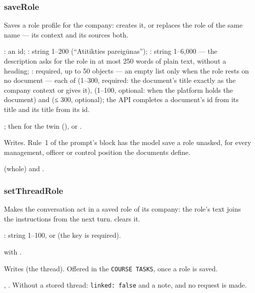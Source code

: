 \subsubsection{saveRole}\label{sec:tools:saveRole}
\begin{description}[style=multiline, leftmargin=19mm, labelwidth=17mm, labelsep=2mm,
  font=\sffamily\bfseries\footnotesize\color{ink}, itemsep=1pt, topsep=2pt, before=\raggedright]
  \item[Does] Saves a role profile for the company: creates it, or replaces the role of the
    same name --- its context and its sources both.
  \item[Input] : an id; : string 1--200 (\enquote{Atitikties
    pareigūnas}); : string 1--6,000 --- the description asks for the
    role in at most 250 words of plain text, without a heading; : required, up
    to 50 objects --- an empty list only when the role rests on no document --- each of
     (1--300, required: the document's title exactly as the company context or
     gives it),  (1--100, optional: when the platform
    holds the document) and  (≤ 300, optional);
    the API completes a document's id from its title and its title from its id.
  \item[Calls] ; then
     for the twin (), or
    .
  \item[Kind] Writes. Rule~1 of the prompt's  block has the model save a role
    unasked, for every management, officer or control position the documents define.
  \item[Returns]  (whole) and .
\end{description}

\subsubsection{setThreadRole}\label{sec:tools:setThreadRole}
\begin{description}[style=multiline, leftmargin=19mm, labelwidth=17mm, labelsep=2mm,
  font=\sffamily\bfseries\footnotesize\color{ink}, itemsep=1pt, topsep=2pt, before=\raggedright]
  \item[Does] Makes the conversation act in a saved role of its company: the role's text
    joins the instructions from the next turn.  clears it.
  \item[Input] : string 1--100, or  (the key is required).
  \item[Calls]  with .
  \item[Kind] Writes (the thread). Offered in the \texttt{COURSE TASKS}, once a role is saved.
  \item[Returns] , . Without a stored thread: \texttt{linked: false}
    and a note, and no request is made.
\end{description}


